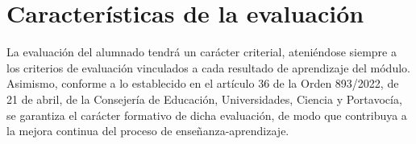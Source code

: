 

\section{Características de la evaluación}


La evaluación del alumnado tendrá un carácter criterial, ateniéndose siempre a los criterios de evaluación vinculados a cada resultado de aprendizaje del módulo. Asimismo, conforme a lo establecido en el artículo 36 de la Orden 893/2022, de 21 de abril, de la Consejería de Educación, Universidades, Ciencia y Portavocía, se garantiza el carácter formativo de dicha evaluación, de modo que contribuya a la mejora continua del proceso de enseñanza-aprendizaje.


